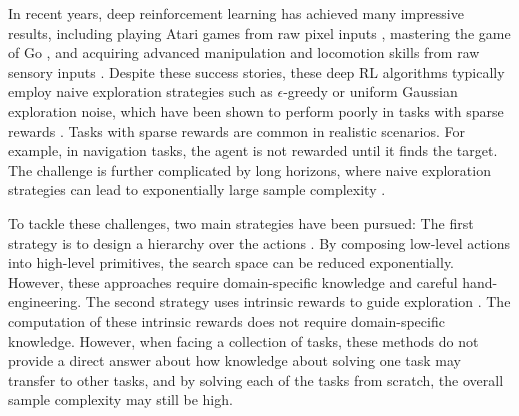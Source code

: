 \documentclass{article} %
\begin{document}
In recent years, deep reinforcement learning has achieved many impressive results, including playing Atari games from raw pixel inputs \citep{guo2014deep, mnih2015human, Schulman15TRPO}, mastering the game of Go \citep{silver2016mastering}, and acquiring advanced manipulation and locomotion skills from raw sensory inputs \citep{Schulman15TRPO, lillicrap2015continuous, watter2015embed, schulman2016high, heess2015learning, levine2016end}.
Despite these success stories, these deep RL algorithms typically employ naive exploration strategies such as $\epsilon$-greedy or uniform Gaussian exploration noise, which have been shown to perform poorly in tasks with sparse rewards \citep{duan2016benchmarking, houthooft2016variational, bellemare2016unifying}.
Tasks with sparse rewards are common in realistic scenarios. 
For example, in navigation tasks, the agent is not rewarded until it finds the target. The challenge is further complicated by long horizons, where naive exploration strategies can lead to exponentially large sample complexity \citep{osband2014generalization}.

To tackle these challenges, two main strategies have been pursued:
The first strategy is to design a hierarchy over the actions \citep{parr1998reinforcement, sutton1999between, dietterich2000hierarchical}.
By composing low-level actions into high-level primitives, the search space can be reduced exponentially. However, these approaches require domain-specific knowledge and careful hand-engineering. The second strategy uses intrinsic rewards to guide exploration \citep{schmidhuber1991curious, schmidhuber2010formal, houthooft2016variational, bellemare2016unifying}.
The computation of these intrinsic rewards does not require domain-specific knowledge.
However, when facing a collection of tasks, these methods do not provide a direct answer about how knowledge about solving one task may transfer to other tasks, and by solving each of the tasks from scratch, the overall sample complexity may still be high.
\end{document}
